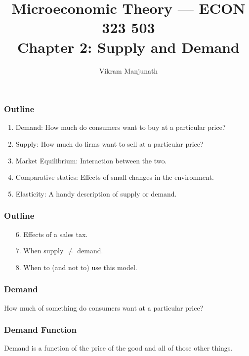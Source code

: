 \documentclass[xcolor=pdftex,dvipsnames]{beamer}
\title{Microeconomic Theory --- ECON 323 503 \\ Chapter 2: Supply and Demand}
\author{Vikram Manjunath}
\institute{Texas A\&M University}
\begin{document}
\maketitle

\begin{frame}
\frametitle{Outline}
\begin{enumerate}[<+->]
\item Demand: How much do consumers want to buy at a particular price?
\item Supply: How much do firms want to sell at a particular price?
\item Market Equilibrium: Interaction between the two.
\item Comparative statics: Effects of small changes in the environment.
\item Elasticity: A handy description of supply or demand.
\end{enumerate}
\end{frame}


\begin{frame}
\frametitle{Outline}
\begin{enumerate}[<+->]
\item[6.] Effects of a sales tax.
\item[7.] When supply $\neq$ demand.
\item[8.] When to (and not to) use this model.
\end{enumerate}
\end{frame}


\begin{frame}
\frametitle{Demand}
How much of something do consumers want at a particular price?\bigskip

\end{frame}


\begin{frame}
\frametitle{Demand Function}
Demand is a function of the  price of the good  and all of those other things.\bigskip

\end{frame}
\end{document}
